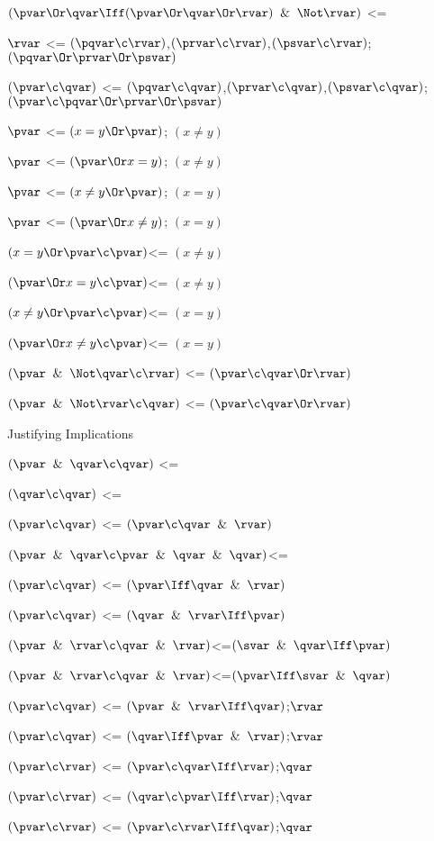$(\pvar \Or \qvar \Iff (\pvar \Or \qvar \Or \rvar) \And \Not \rvar)$ <= 

$\rvar$ <= $(\pqvar\c\rvar)$,$(\prvar\c\rvar)$,$(\psvar\c\rvar)$;$(\pqvar\Or\prvar\Or\psvar)$

$(\pvar \c \qvar)$ <= $(\pqvar \c \qvar)$,$(\prvar \c \qvar)$,$(\psvar \c \qvar)$;$(\pvar \c \pqvar \Or \prvar \Or \psvar )$ 

$\pvar$ <= $(x = y \Or \pvar)$; $(x \ne y)$

$\pvar$ <= $(\pvar \Or x = y)$; $(x \ne y)$

$\pvar$ <= $(x \ne y \Or \pvar)$; $(x = y)$

$\pvar$ <= $(\pvar \Or x \ne y)$; $(x = y)$

$(x = y \Or \pvar \c \pvar)$<= $(x \ne y)$

$(\pvar \Or x = y \c \pvar)$<= $(x \ne y)$

$(x \ne y \Or \pvar \c \pvar)$<= $(x = y)$

$(\pvar \Or x \ne y \c \pvar)$<=  $(x = y)$

$(\pvar \And \Not\qvar \c \rvar)$ <= $(\pvar \c \qvar \Or \rvar)$

$(\pvar \And \Not\rvar \c \qvar)$ <= $(\pvar \c \qvar \Or \rvar)$

\lineb


Justifying Implications
\lineb

$(\pvar \And \qvar \c \qvar)$ <=

$(\qvar \c \qvar)$ <=

$(\pvar \c \qvar)$ <= $(\pvar \c \qvar \And \rvar)$

$(\pvar \And \qvar \c \pvar \And \qvar \And \qvar)$<=

$(\pvar \c \qvar)$ <= $(\pvar \Iff \qvar \And \rvar)$

$(\pvar \c \qvar)$ <= $(\qvar \And \rvar\Iff \pvar)$

$(\pvar \And \rvar \c \qvar \And \rvar)$<=$(\svar \And \qvar \Iff \pvar)$

$(\pvar \And \rvar \c \qvar \And \rvar)$<=$(\pvar \Iff \svar \And \qvar)$

$(\pvar \c \qvar)$ <= $(\pvar \And \rvar \Iff \qvar)$;$\rvar$

$(\pvar \c \qvar)$ <= $(\qvar \Iff \pvar\And\rvar)$;$\rvar$

$(\pvar \c \rvar)$ <=  $(\pvar \c \qvar\Iff \rvar)$;$\qvar$

$(\pvar \c \rvar)$ <=  $(\qvar \c \pvar\Iff \rvar)$;$\qvar$

$(\pvar \c \rvar)$ <=  $(\pvar \c \rvar\Iff \qvar)$;$\qvar$

